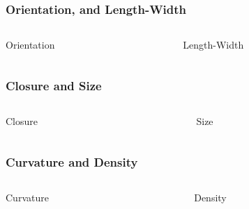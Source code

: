 \documentclass[12pt]{beamer}\usepackage[]{graphicx}\usepackage[]{color}
\begin{document}
\begin{frame}
\frametitle{Orientation, and Length-Width}

\begin{columns}[t]
\begin{column}{0.5\textwidth}
\begin{center}
Orientation
\end{center}
\end{column}

\begin{column}{0.5\textwidth}
\begin{center}
Length-Width
\end{center}
\end{column}
\end{columns}

\end{frame}


\begin{frame}
\frametitle{Closure and Size}

\begin{columns}[t]
\begin{column}{0.5\textwidth}
\begin{center}
Closure
\end{center}
\end{column}

\begin{column}{0.5\textwidth}
\begin{center}
Size
\end{center}
\end{column}
\end{columns}

\end{frame}


\begin{frame}
\frametitle{Curvature and Density}

\begin{columns}[t]
\begin{column}{0.5\textwidth}
\begin{center}
Curvature
\end{center}
\end{column}

\begin{column}{0.5\textwidth}
\begin{center}
Density
\end{center}
\end{column}
\end{columns}

\end{frame}
\end{document}

